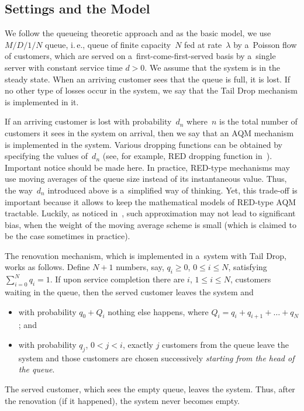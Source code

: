 \begin{multicols}{2}
\section{Settings and the Model}

\noindent
We follow the queueing theoretic approach and as the basic model, we use $M/D/1/N$ queue,
i.\,e., queue of finite capacity~$N$ fed at rate~$\lambda$ by a~Poisson flow of customers,
which are served on a~first-come-first-served basis  by a~single server with constant
service time $d>0$.
We assume that the system is in the steady state.
When an arriving customer sees that the queue is full,
it is lost. If no other type of losses occur in the system,
we say that the Tail Drop mechanism is implemented in it.

If an arriving customer is lost with probability~$d_n$
where~$n$ is the total number of customers 
it sees in the system on arrival, then we say that an AQM mechanism 
is implemented in the system. Various dropping functions can be obtained
by specifying the values of~$d_n$
(see, for example, RED dropping function in~\cite[Example 1]{Chyd}).
Important notice should be made here. In practice, RED-type mechanisms 
may use moving averages of the queue size instead of its instantaneous value. 
Thus, the way~$d_n$ introduced above is a~simplified way of thinking.
Yet, this trade-off is important because it allows to keep the mathematical 
models of RED-type AQM tractable.
Luckily, as noticed in~\cite[Section II.C]{Bonald}, such approximation may not
lead to significant bias, when the weight of the moving average scheme is small
(which is claimed to be the case sometimes in practice).

The renovation mechanism, which is implemented in a~system with Tail Drop,
works as follows. Define $N+1$ numbers, say, $q_i\ge 0$,
$0 \le i \le N$, satisfying \mbox{$\sum\nolimits_{i=0}^N q_i=1$}.
If upon service completion there are $i$, $1 \le i \le N$, customers
waiting in the queue, then the served customer leaves the system and
\begin{itemize}
\item with probability $q_0+Q_i$ nothing else happens, where 
$Q_i=q_i+q_{i+1}+\dots+ q_N$; and
\item with probability $q_j$, $0<j<i$, exactly $j$ customers
from the queue leave the system and those customers 
are chosen successively \textit{starting from the head of the queue}.
\end{itemize}
The served customer, which sees the empty queue, leaves the system.
Thus, after the renovation (if it happened), the system never becomes empty.


\end{multicols}
